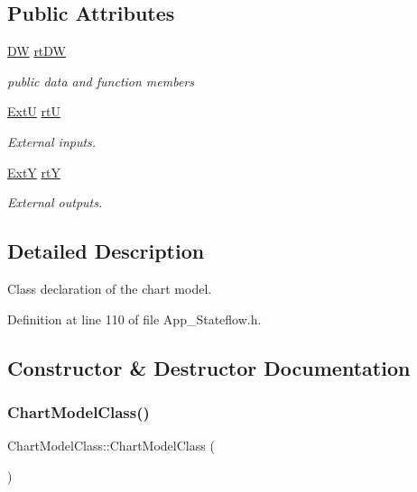 \subsection*{Public Attributes}
\begin{DoxyCompactItemize}
\item 
\mbox{\hyperlink{struct_d_w}{DW}} \mbox{\hyperlink{class_chart_model_class_a1c2dcf4c77e74c040501b76bd18eebf8}{rt\+DW}}
\begin{DoxyCompactList}\small\item\em public data and function members \end{DoxyCompactList}\item 
\mbox{\hyperlink{struct_ext_u}{ExtU}} \mbox{\hyperlink{class_chart_model_class_aa557038e416c73872f813e4206084532}{rtU}}
\begin{DoxyCompactList}\small\item\em External inputs. \end{DoxyCompactList}\item 
\mbox{\hyperlink{struct_ext_y}{ExtY}} \mbox{\hyperlink{class_chart_model_class_ac7425d26c91af4aaed697e7ac65b46fa}{rtY}}
\begin{DoxyCompactList}\small\item\em External outputs. \end{DoxyCompactList}\end{DoxyCompactItemize}


\subsection{Detailed Description}
Class declaration of the chart model. 

Definition at line 110 of file App\+\_\+\+Stateflow.\+h.



\subsection{Constructor \& Destructor Documentation}
\mbox{\label{class_chart_model_class_ac943318da1975acdd0bee749a1372c47}} 
\subsubsection{\texorpdfstring{ChartModelClass()}{ChartModelClass()}}
{\footnotesize\ttfamily Chart\+Model\+Class\+::\+Chart\+Model\+Class (\begin{DoxyParamCaption}{ }\end{DoxyParamCaption})}




